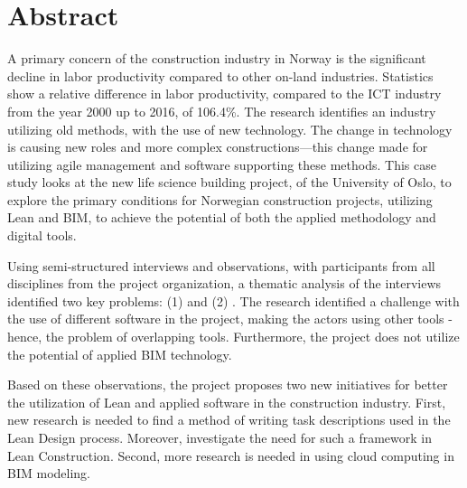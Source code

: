 \clearpage
{} 				
\setcounter{page}{1}

\pagestyle{fancy}
\fancyhf{}
\renewcommand{\chaptermark}[1]{\markboth{\chaptername\ \thechapter.\ #1}{}}
\renewcommand{\sectionmark}[1]{\markright{\thesection\ #1}}
\renewcommand{\headrulewidth}{0.1ex}
\renewcommand{\footrulewidth}{0.1ex}
\fancyfoot[LE,RO]{\thepage}
\fancypagestyle{plain}{\fancyhf{}\fancyfoot[LE,RO]{\thepage}\renewcommand{\headrulewidth}{0ex}}

\section*{\Large Abstract}

\noindent A primary concern of the construction industry in Norway is the significant decline in labor productivity compared to other on-land industries. Statistics show a relative difference in labor productivity, compared to the ICT industry from the year 2000 up to 2016, of 106.4\%. The research identifies an industry utilizing old methods, with the use of new technology. The change in technology is causing new roles and more complex constructions—this change made for utilizing agile management and software supporting these methods. This case study looks at the new life science building project, of the University of Oslo, to explore the primary conditions for Norwegian construction projects, utilizing Lean and BIM, to achieve the potential of both the applied methodology and digital tools.

Using semi-structured interviews and observations, with participants from all disciplines from the project organization, a thematic analysis of the interviews identified two key problems: (1)  and (2) . The research identified a challenge with the use of different software in the project, making the actors using other tools - hence, the problem of overlapping tools. Furthermore, the project does not utilize the potential of applied BIM technology.

Based on these observations, the project proposes two new initiatives for better the utilization of Lean and applied software in the construction industry. First, new research is needed to find a method of writing task descriptions used in the Lean Design process. Moreover, investigate the need for such a framework in Lean Construction. Second, more research is needed in using cloud computing in BIM modeling.

\clearpage
